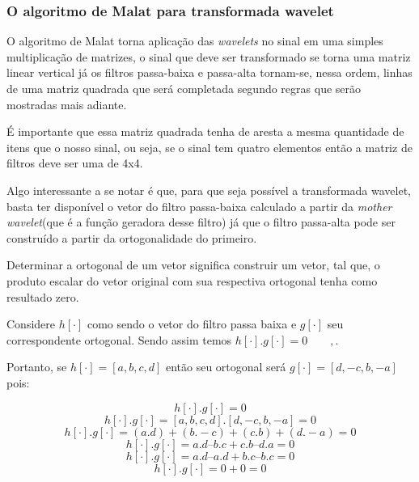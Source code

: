 \begin{myenv}{1.5}
			\subsubsection{O algoritmo de Malat para transformada wavelet}
				\par O algoritmo de Malat torna aplicação das \textit{wavelets} no sinal em uma simples multiplicação de matrizes, o sinal que deve ser transformado se torna uma matriz linear vertical já os filtros passa-baixa e passa-alta tornam-se, nessa ordem, linhas de uma matriz quadrada que será completada segundo regras que serão mostradas mais adiante.
				\par É importante que essa matriz quadrada tenha de aresta a mesma quantidade de itens que o nosso sinal, ou seja, se o sinal tem quatro elementos então a matriz de filtros deve ser uma de 4x4.
				\par Algo interessante a se notar é que, para que seja possível a transformada wavelet, basta ter disponível o vetor do filtro passa-baixa calculado a partir da \textit{mother wavelet}(que é a função geradora desse filtro) já que o filtro passa-alta pode ser construído a partir da ortogonalidade do primeiro.
				
				\par Determinar a ortogonal de um vetor significa construir um vetor, tal que, o produto escalar do vetor original com sua respectiva ortogonal tenha como resultado zero.
				
				\par Considere $h[\cdot]$ como sendo o vetor do filtro passa baixa e $g[\cdot]$ seu correspondente ortogonal. Sendo assim temos $h[\cdot] . g[\cdot] = 0\qquad,$.
				
				\par Portanto, se $h[\cdot]=[a, b, c, d]$ então seu ortogonal será $g[\cdot]=[d, -c, b, -a]$ pois:
				
				\begin{equation}
					h[\cdot] . g[\cdot]  = 0
				\end{equation}
				\begin{equation}
					h[\cdot] . g[\cdot]  = [a, b, c, d] . [d, -c, b, -a] = 0
				\end{equation}
				\begin{equation}
					h[\cdot] . g[\cdot]  = (a.d) + (b.-c) + (c.b) + (d.-a) = 0
				\end{equation}
				\begin{equation}
					h[\cdot] . g[\cdot]  = a.d – b.c + c.b – d.a = 0
				\end{equation}
				\begin{equation}
					h[\cdot] . g[\cdot]  = a.d – a.d + b.c – b.c = 0
				\end{equation}
				\begin{equation}
					h[\cdot] . g[\cdot]  = 0 + 0 = 0
				\end{equation}


\end{myenv}
